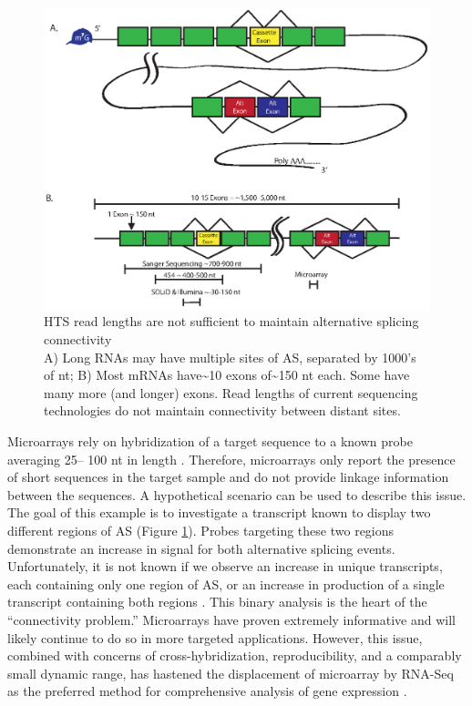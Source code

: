     \begin{figure} %
      \centering 
      \includegraphics{Figures/Intro/SeqLengths_and_Connectivity.eps}
      \caption[HTS read lengths are not sufficient to maintain alternative splicing connectivity]
      {
        HTS read lengths are not sufficient to maintain alternative splicing connectivity\\[0.25cm]
        A) Long RNAs may have multiple sites of AS, separated by 1000's of nt; B) Most mRNAs have\textasciitilde10 exons of\textasciitilde150 nt each. Some have many more (and longer) exons. Read lengths of current sequencing technologies do not maintain connectivity between distant sites.
        }
      \label{Intro:fig:NoConnectivityInHTSMethods}
      \end{figure}

    Microarrays rely on hybridization of a target sequence to a known probe averaging 25-- 100 nt in length \citep{Southern2001}. Therefore, microarrays  only report the presence of short sequences in the target sample and do not provide linkage information between the sequences. A hypothetical scenario can be used to describe this issue. The goal of this example is to investigate a transcript known to display two different regions of AS (Figure \ref{Intro:fig:NoConnectivityInHTSMethods}). Probes targeting these two regions demonstrate an increase in signal for both alternative splicing events. Unfortunately, it is not known if we observe an increase in unique transcripts, each containing only one region of AS, or an increase in production of a single transcript containing both regions \citep{Calarco2007}. This binary analysis is the heart of the ``connectivity problem.'' Microarrays have proven extremely informative and will likely continue to do so in more targeted applications. However, this issue, combined with concerns of cross-hybridization, reproducibility, and a comparably small dynamic range, has hastened the displacement of microarray by RNA-Seq as the preferred method for comprehensive analysis of gene expression \citep{Shendure2008}.

